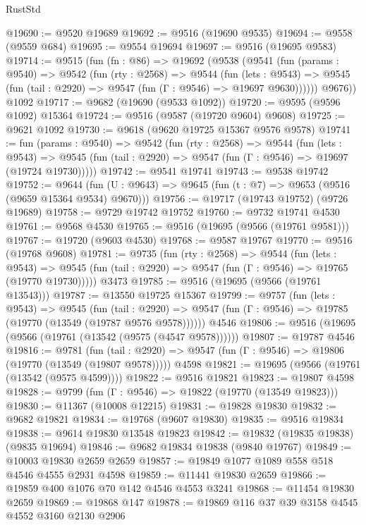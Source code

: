 \begin{lexlean}{RustStd}
\begin{coremodule}
@19690 := @9520 @19689
@19692 := @9516 (@19690 @9535)
@19694 := @9558 (@9559 @684)
@19695 := @9554 @19694
@19697 := @9516 (@19695 @9583)
@19714 := @9515
    (fun (fn : @86) =>
    @19692
      (@9538
        (@9541
          (fun (params : @9540) =>
          @9542
            (fun (rty : @2568) =>
            @9544
              (fun (lets : @9543) =>
              @9545 (fun (tail : @2920) => @9547 (fun (Γ : @9546) => @19697 @9630))))))
        @9676))
    @1092
@19717 := @9682 (@19690 (@9533 @1092))
@19720 := @9595 (@9596 @1092) @15364
@19724 := @9516 (@9587 (@19720 @9604) @9608)
@19725 := @9621 @1092
@19730 := @9618 (@9620 @19725 @15367 @9576 @9578)
@19741 := fun (params : @9540) =>
  @9542
    (fun (rty : @2568) =>
    @9544
      (fun (lets : @9543) =>
      @9545 (fun (tail : @2920) => @9547 (fun (Γ : @9546) => @19697 (@19724 @19730)))))
@19742 := @9541 @19741
@19743 := @9538 @19742
@19752 := @9644
    (fun (U : @9643) => @9645 (fun (t : @7) => @9653 (@9516 (@9659 @15364 @9534) @9670)))
@19756 := @19717 (@19743 @19752) (@9726 @19689)
@19758 := @9729 @19742 @19752
@19760 := @9732 @19741 @4530
@19761 := @9568 @4530
@19765 := @9516 (@19695 (@9566 (@19761 @9581)))
@19767 := @19720 (@9603 @4530)
@19768 := @9587 @19767
@19770 := @9516 (@19768 @9608)
@19781 := @9735
    (fun (rty : @2568) =>
    @9544
      (fun (lets : @9543) =>
      @9545 (fun (tail : @2920) => @9547 (fun (Γ : @9546) => @19765 (@19770 @19730)))))
    @3473
@19785 := @9516 (@19695 (@9566 (@19761 @13543)))
@19787 := @13550 @19725 @15367
@19799 := @9757
    (fun (lets : @9543) =>
    @9545
      (fun (tail : @2920) =>
      @9547 (fun (Γ : @9546) => @19785 (@19770 (@13549 (@19787 @9576 @9578))))))
    @4546
@19806 := @9516 (@19695 (@9566 (@19761 (@13542 (@9575 (@4547 @9578))))))
@19807 := @19787 @4546
@19816 := @9781
    (fun (tail : @2920) => @9547 (fun (Γ : @9546) => @19806 (@19770 (@13549 (@19807 @9578)))))
    @4598
@19821 := @19695 (@9566 (@19761 (@13542 (@9575 @4599))))
@19822 := @9516 @19821
@19823 := @19807 @4598
@19828 := @9799 (fun (Γ : @9546) => @19822 (@19770 (@13549 @19823)))
@19830 := @11367 (@10008 @12215)
@19831 := @19828 @19830
@19832 := @9682 @19821
@19834 := @19768 (@9607 @19830)
@19835 := @9516 @19834
@19838 := @9614 @19830 @13548 @19823
@19842 := @19832 (@19835 @19838) (@9835 @19694)
@19846 := @9682 @19834 @19838 (@9840 @19767)
@19849 := @10003 @19830 @2659 @2659
@19857 := @19849 @1077 @1089 @558 @518 @4546 @4555 @2931 @4598
@19859 := @11441 @19830 @2659
@19866 := @19859 @400 @1076 @70 @142 @4546 @4553 @3241
@19868 := @11454 @19830 @2659
@19869 := @19868 @147
@19878 := @19869 @116 @37 @39 @3158 @4545 @4552 @3160 @2130 @2906

\end{coremodule}
\end{lexlean}
